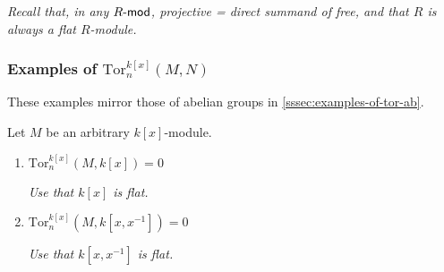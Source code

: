 \documentclass[10pt]{article}
\begin{document}
            \emph{Recall that, in any $R\hbox{-}\mathsf{mod}$, projective = direct
            summand of free, and that $R$ is always a flat $R$-module.}

            \medskip
            

            \subsubsection{Examples of
                $\mathrm{Tor}_n^{k[x]}(M,N)$}

                These examples mirror those of abelian groups in \cref{sssec:examples-of-tor-ab}.

                Let $M$ be an arbitrary $k[x]$-module.

                \begin{enumerate}
                \def\labelenumi{\arabic{enumi}.}
                \item
                  $\mathrm{Tor}_n^{k[x]}(M,k[x])=0$

                  \emph{Use that $k[x]$ is flat.}
                \item
                  $\mathrm{Tor}_n^{k[x]}(M,k[x,x^{-1}])=0$

                  \emph{Use that $k[x,x^{-1}]$ is flat.}
                \end{enumerate}

\end{document}
